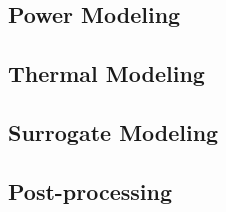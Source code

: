 \subsection{Power Modeling} 


\subsection{Thermal Modeling} 


\subsection{Surrogate Modeling} 


\vspace{-1em}
\subsection{Post-processing} 

